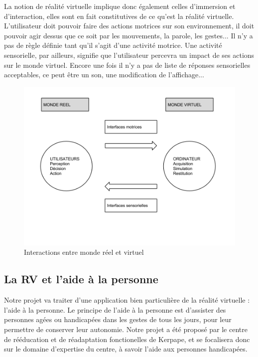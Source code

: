 La notion de réalité virtuelle implique donc également celles d'immersion et d'interaction, elles sont en fait constitutives de ce  qu'est la réalité virtuelle. L'utilisateur doit pouvoir faire des actions motrices sur son environnement, il doit pouvoir agir dessus que ce soit par les mouvements, la parole, les gestes... Il n'y a pas de règle définie tant qu'il s'agit d'une activité motrice. 
Une activité sensorielle, par ailleurs, signifie que l'utilisateur percevra un impact de ses actions sur le monde virtuel. Encore une fois il n'y a pas de liste de réponses sensorielles acceptables, ce peut être un son, une modification de l'affichage...
\begin{figure}
  \caption{Interactions entre monde réel et virtuel}
  \centering
  \includegraphics[scale=0.5,bb=0 0 960 720]{1-PreEtude/graphe_interfaces.png}
\end{figure}	%

\subsection{La RV et l'aide à la personne}
Notre projet va traiter d'une application bien particulière de la réalité virtuelle : l'aide à la personne. Le principe de l'aide à la personne est d'assister des personnes agées ou handicapées dans les gestes de tous les jours, pour leur permettre de conserver leur autonomie. Notre projet a été proposé par le centre de rééducation et de réadaptation fonctionelles de Kerpape, et se focalisera donc sur le domaine d'expertise du centre, à savoir l'aide aux personnes handicapées. \\

